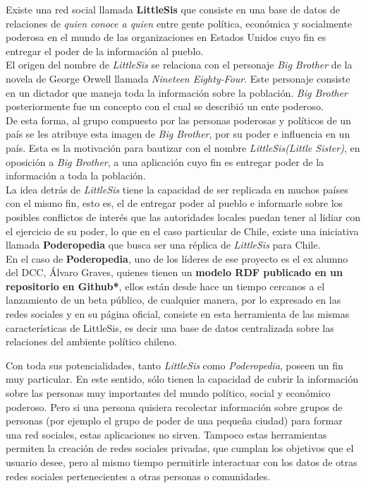 \begin{intro}
Existe una red social llamada \textbf{LittleSis}\cite{littlesis} que consiste en una base de datos de relaciones de \emph{quien conoce a quien} entre gente política, económica y socialmente poderosa en el mundo de las organizaciones en Estados Unidos cuyo fin es entregar el poder de la información al pueblo.\\

El origen del nombre de \emph{LittleSis} se relaciona con el personaje \emph{Big Brother} de la novela de George Orwell llamada \emph{Nineteen Eighty-Four}. Este personaje consiste en un dictador que maneja toda la información sobre la población. \emph{Big Brother} posteriormente fue un concepto con el cual se describió un ente poderoso.\\
 
De esta forma, al grupo compuesto por las personas poderosas y políticos de un país se les atribuye esta imagen de \emph{Big Brother}, por su poder e influencia en un país. Esta es la motivación para bautizar con el nombre \emph{LittleSis}\emph{(Little Sister)}, en oposición a \emph{Big Brother}, a una aplicación cuyo fin es entregar poder de  la información a toda la población.\\

La idea detrás de \emph{LittleSis} tiene la capacidad de ser replicada en muchos países con el mismo fin, esto es, el de entregar poder al pueblo e informarle sobre los posibles conflictos de interés que las autoridades locales puedan tener al lidiar con el ejercicio de su poder, lo que en el caso particular de Chile, existe una iniciativa llamada \textbf{Poderopedia}\cite{poderopedia} que busca ser una réplica de \emph{LittleSis} para Chile.\\

En el caso de \textbf{Poderopedia}, uno de los líderes de ese proyecto es el ex alumno del DCC, Álvaro Graves, quienes tienen un \textbf{modelo RDF publicado en un repositorio en Github*}, ellos están desde hace un tiempo cercanos a el lanzamiento de un beta público, de cualquier manera, por lo expresado en las redes sociales y en su página oficial, consiste en esta herramienta de las mismas características de LittleSis, es decir una base de datos centralizada sobre las relaciones del ambiente político chileno.

Con toda sus potencialidades, tanto \emph{LittleSis} como \emph{Poderopedia}, poseen un fin muy particular. En este sentido, sólo tienen la capacidad de cubrir la información sobre las personas muy importantes del mundo político, social y económico poderoso. Pero si una persona quisiera recolectar información sobre grupos de personas (por ejemplo el grupo de poder de una pequeña ciudad) para formar una red sociales, estas aplicaciones no sirven. Tampoco estas herramientas permiten la creación de redes sociales privadas, que cumplan los objetivos que el usuario desee, pero al mismo tiempo permitirle interactuar con los datos de otras redes sociales pertenecientes a otras personas o comunidades.\\


\end{intro}
